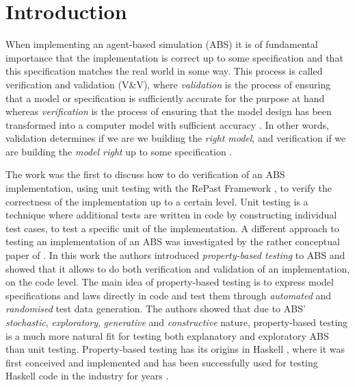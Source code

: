 \section{Introduction}
\label{sec:introduction}
When implementing an agent-based simulation (ABS) it is of fundamental importance that the implementation is correct up to some specification and that this specification matches the real world in some way. This process is called verification and validation (V\&V), where \textit{validation} is the process of ensuring that a model or specification is sufficiently accurate for the purpose at hand whereas \textit{verification} is the process of ensuring that the model design has been transformed into a computer model with sufficient accuracy \cite{robinson_simulation:_2014}. In other words, validation determines if we are we building the \textit{right model}, and verification if we are building the \textit{model right} up to some specification \cite{balci_verification_1998}.

The work \cite{collier_test-driven_2013} was the first to discuss how to do verification of an ABS implementation, using unit testing with the RePast Framework \cite{north_complex_2013}, to verify the correctness of the implementation up to a certain level. Unit testing is a technique where additional tests are written in code by constructing individual test cases, to test a specific unit of the implementation. A different approach to testing an implementation of an ABS was investigated by the rather conceptual paper of \cite{thaler_show_2019}. In this work the authors introduced \textit{property-based testing} to ABS and showed that it allows to do both verification and validation of an implementation, on the code level. The main idea of property-based testing is to express model specifications and laws directly in code and test them through \textit{automated} and \textit{randomised} test data generation. The authors showed that due to ABS' \textit{stochastic}, \textit{exploratory}, \textit{generative} and \textit{constructive} nature, property-based testing is a much more natural fit for testing both explanatory and exploratory ABS than unit testing. Property-based testing has its origins in Haskell \cite{claessen_quickcheck_2000,claessen_testing_2002}, where it was first conceived and implemented and has been successfully used for testing Haskell code in the industry for years \cite{hughes_quickcheck_2007}.

